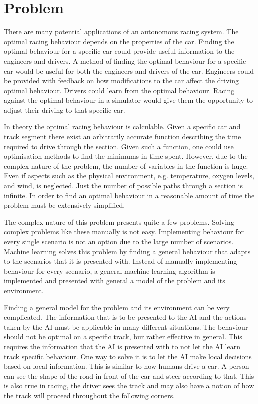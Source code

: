 \section{Problem}
There are many potential applications of an autonomous racing system. The optimal racing behaviour depends on the properties of the car. Finding the optimal behaviour for a specific car could provide useful information to the engineers and drivers. A method of finding the optimal behaviour for a specific car would be useful for both the engineers and drivers of the car. Engineers could be provided with feedback on how modifications to the car affect the driving optimal behaviour. Drivers could learn from the optimal behaviour. Racing against the optimal behaviour in a simulator would give them the opportunity to adjust their driving to that specific car.

In theory the optimal racing behaviour is calculable. Given a specific car and track segment there exist an arbitrarily accurate function describing the time required to drive through the section. Given such a function, one could use optimisation methods to find the minimums in time spent. However, due to the complex nature of the problem, the number of variables in the function is huge. Even if aspects such as the physical environment, e.g. temperature, oxygen levels, and wind, is neglected. Just the number of possible paths through a section is infinite. In order to find an optimal behaviour in a reasonable amount of time the problem must be extensively simplified.

The complex nature of this problem presents quite a few problems. Solving complex problems like these manually is not easy. Implementing behaviour for every single scenario is not an option due to the large number of scenarios. Machine learning solves this problem by finding a general behaviour that adapts to the scenarios that it is presented with. Instead of manually implementing behaviour for every scenario, a general machine learning algorithm is implemented and presented with general a model of the problem and its environment.

Finding a general model for the problem and its environment can be very complicated. The information that is to be presented to the AI and the actions taken by the AI must be applicable in many different situations. The behaviour should not be optimal on a specific track, bur rather effective in general. This requires the information that the AI is presented with to not let the AI learn track specific behaviour. One way to solve it is to let the AI make local decisions based on local information. This is similar to how humans drive a car. A person can see the shape of the road in front of the car and steer according to that. This is also true in racing, the driver sees the track and may also have a notion of how the track will proceed throughout the following corners.

